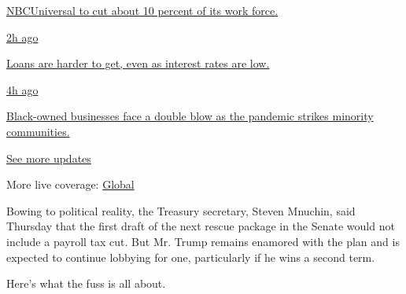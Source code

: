 \href{https://www.nytimes.com/live/2020/08/04/business/stock-market-today-coronavirus?action=click\&pgtype=Article\&state=default\&region=MAIN_CONTENT_1\&context=storylines_live_updates\#nbcuniversal-to-cut-about-10-percent-of-its-work-force}{NBCUniversal
to cut about 10 percent of its work force.}

\href{https://www.nytimes.com/live/2020/08/04/business/stock-market-today-coronavirus?action=click\&pgtype=Article\&state=default\&region=MAIN_CONTENT_1\&context=storylines_live_updates\#loans-are-harder-to-get-even-as-interest-rates-are-low}{2h
ago}

\href{https://www.nytimes.com/live/2020/08/04/business/stock-market-today-coronavirus?action=click\&pgtype=Article\&state=default\&region=MAIN_CONTENT_1\&context=storylines_live_updates\#loans-are-harder-to-get-even-as-interest-rates-are-low}{Loans
are harder to get, even as interest rates are low.}

\href{https://www.nytimes.com/live/2020/08/04/business/stock-market-today-coronavirus?action=click\&pgtype=Article\&state=default\&region=MAIN_CONTENT_1\&context=storylines_live_updates\#black-owned-businesses-face-a-double-blow-as-the-pandemic-strikes-minority-communities}{4h
ago}

\href{https://www.nytimes.com/live/2020/08/04/business/stock-market-today-coronavirus?action=click\&pgtype=Article\&state=default\&region=MAIN_CONTENT_1\&context=storylines_live_updates\#black-owned-businesses-face-a-double-blow-as-the-pandemic-strikes-minority-communities}{Black-owned
businesses face a double blow as the pandemic strikes minority
communities.}

\href{https://www.nytimes.com/live/2020/08/04/business/stock-market-today-coronavirus?action=click\&pgtype=Article\&state=default\&region=MAIN_CONTENT_1\&context=storylines_live_updates}{See
more updates}

More live coverage:
\href{https://www.nytimes.com/2020/08/04/world/coronavirus-cases.html?action=click\&pgtype=Article\&state=default\&region=MAIN_CONTENT_1\&context=storylines_live_updates}{Global}

Bowing to political reality, the Treasury secretary, Steven Mnuchin,
said Thursday that the first draft of the next rescue package in the
Senate would not include a payroll tax cut. But Mr. Trump remains
enamored with the plan and is expected to continue lobbying for one,
particularly if he wins a second term.

Here's what the fuss is all about.

